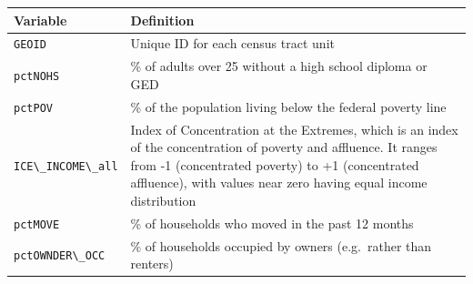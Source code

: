 \documentclass[
]{book}
\newcommand{\passthrough}[1]{#1}
\begin{document}
\begin{longtable}[]{@{}ll@{}}
\toprule
\begin{minipage}[b]{0.31\columnwidth}\raggedright
Variable\strut
\end{minipage} & \begin{minipage}[b]{0.63\columnwidth}\raggedright
Definition\strut
\end{minipage}\tabularnewline
\midrule
\endhead
\begin{minipage}[t]{0.31\columnwidth}\raggedright
\passthrough{\lstinline!GEOID!}\strut
\end{minipage} & \begin{minipage}[t]{0.63\columnwidth}\raggedright
Unique ID for each census tract unit\strut
\end{minipage}\tabularnewline
\begin{minipage}[t]{0.31\columnwidth}\raggedright
\passthrough{\lstinline!pctNOHS!}\strut
\end{minipage} & \begin{minipage}[t]{0.63\columnwidth}\raggedright
\% of adults over 25 without a high school diploma or GED\strut
\end{minipage}\tabularnewline
\begin{minipage}[t]{0.31\columnwidth}\raggedright
\passthrough{\lstinline!pctPOV!}\strut
\end{minipage} & \begin{minipage}[t]{0.63\columnwidth}\raggedright
\% of the population living below the federal poverty line\strut
\end{minipage}\tabularnewline
\begin{minipage}[t]{0.31\columnwidth}\raggedright
\passthrough{\lstinline!ICE\_INCOME\_all!}\strut
\end{minipage} & \begin{minipage}[t]{0.63\columnwidth}\raggedright
Index of Concentration at the Extremes, which is an index of the concentration of poverty and affluence. It ranges from -1 (concentrated poverty) to +1 (concentrated affluence), with values near zero having equal income distribution\strut
\end{minipage}\tabularnewline
\begin{minipage}[t]{0.31\columnwidth}\raggedright
\passthrough{\lstinline!pctMOVE!}\strut
\end{minipage} & \begin{minipage}[t]{0.63\columnwidth}\raggedright
\% of households who moved in the past 12 months\strut
\end{minipage}\tabularnewline
\begin{minipage}[t]{0.31\columnwidth}\raggedright
\passthrough{\lstinline!pctOWNDER\_OCC!}\strut
\end{minipage} & \begin{minipage}[t]{0.63\columnwidth}\raggedright
\% of households occupied by owners (e.g.~rather than renters)\strut
\end{minipage}\tabularnewline
\bottomrule
\end{longtable}
\end{document}
